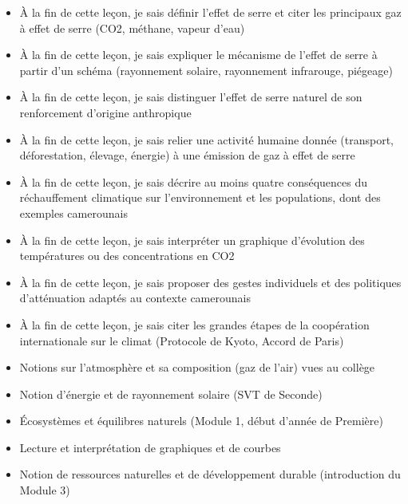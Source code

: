 \documentclass[11pt]{article}
\begin{document}
\begin{objectifs}
\begin{itemize}
\item À la fin de cette leçon, je sais définir l'effet de serre et citer les principaux gaz à effet de serre (CO2, méthane, vapeur d'eau)
\item À la fin de cette leçon, je sais expliquer le mécanisme de l'effet de serre à partir d'un schéma (rayonnement solaire, rayonnement infrarouge, piégeage)
\item À la fin de cette leçon, je sais distinguer l'effet de serre naturel de son renforcement d'origine anthropique
\item À la fin de cette leçon, je sais relier une activité humaine donnée (transport, déforestation, élevage, énergie) à une émission de gaz à effet de serre
\item À la fin de cette leçon, je sais décrire au moins quatre conséquences du réchauffement climatique sur l'environnement et les populations, dont des exemples camerounais
\item À la fin de cette leçon, je sais interpréter un graphique d'évolution des températures ou des concentrations en CO2
\item À la fin de cette leçon, je sais proposer des gestes individuels et des politiques d'atténuation adaptés au contexte camerounais
\item À la fin de cette leçon, je sais citer les grandes étapes de la coopération internationale sur le climat (Protocole de Kyoto, Accord de Paris)
\end{itemize}
\end{objectifs}

\begin{prerequis}
\begin{itemize}
\item Notions sur l'atmosphère et sa composition (gaz de l'air) vues au collège
\item Notion d'énergie et de rayonnement solaire (SVT de Seconde)
\item Écosystèmes et équilibres naturels (Module 1, début d'année de Première)
\item Lecture et interprétation de graphiques et de courbes
\item Notion de ressources naturelles et de développement durable (introduction du Module 3)
\end{itemize}
\end{prerequis}

\newpage
\end{document}
